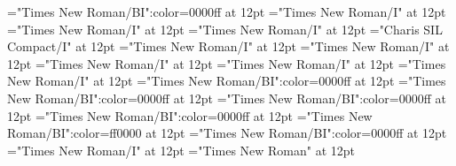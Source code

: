 \documentclass{article}
\begin{document}
 
\thispagestyle{empty} 
\font\exampleusefirstoftypelastoftypesensearticlesectionletter="Times New Roman/BI":color=0000ff at 12pt
\font\lastoftypevariantinflectionarticlesectionletter="Times New Roman/I" at 12pt
\font\variantinflectionarticlesectionletter="Times New Roman/I" at 12pt
\font\firstoftypevariantinflectionarticlesectionletter="Times New Roman/I" at 12pt
\font\firstoftypelastoftypestressfirstoftypelastoftypepronunciationarticlesectionletter="Charis SIL Compact/I" at 12pt
\font\firstoftypelastoftypepronunciationarticlesectionletter="Times New Roman/I" at 12pt
\font\firstoftypeheadwordlastoftypearticlesectionletter="Times New Roman/I" at 12pt
\font\examplefirstoftypelastoftypesubentryarticlesectionletter="Times New Roman/I" at 12pt
\font\firstoftypeheadwordlastoftypefirstoftypelastoftypesubentryarticlesectionletter="Times New Roman/I" at 12pt
\font\firstoftypelastoftypesubentryarticlesectionletter="Times New Roman/I" at 12pt
\font\examplesensearticlesectionletter="Times New Roman/BI":color=0000ff at 12pt
\font\firstoftypelastoftypewordusedefinitionfirstoftypelastoftypesensearticlesectionletter="Times New Roman/BI":color=0000ff at 12pt
\font{}="Times New Roman/BI":color=0000ff at 12pt
\font\firstoftypegrammarcategorylastoftypesensearticlesectionletter="Times New Roman/BI":color=0000ff at 12pt
\font\sensebeforearticlesectionletter="Times New Roman/BI":color=ff0000 at 12pt
\font\sensearticlesectionletter="Times New Roman/BI":color=0000ff at 12pt
\font\articlesectionletter="Times New Roman/I" at 12pt
\font\sectionletter="Times New Roman" at 12pt
\end{document}
